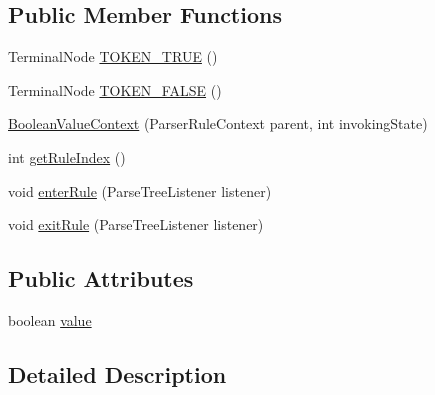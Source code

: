 \subsection*{Public Member Functions}
\begin{DoxyCompactItemize}
\item 
Terminal\+Node \hyperlink{classgov_1_1nasa_1_1jpf_1_1inspector_1_1server_1_1expression_1_1parser_1_1_expression_grammar_parser_1_1_boolean_value_context_a1967c1d88ae5ae1ed71dc1b0293a9e60}{T\+O\+K\+E\+N\+\_\+\+T\+R\+UE} ()
\item 
Terminal\+Node \hyperlink{classgov_1_1nasa_1_1jpf_1_1inspector_1_1server_1_1expression_1_1parser_1_1_expression_grammar_parser_1_1_boolean_value_context_af6b87c58b18cae1ac26f25c9b6704b9f}{T\+O\+K\+E\+N\+\_\+\+F\+A\+L\+SE} ()
\item 
\hyperlink{classgov_1_1nasa_1_1jpf_1_1inspector_1_1server_1_1expression_1_1parser_1_1_expression_grammar_parser_1_1_boolean_value_context_a307b15b7defe4cc95e2d7c9a51c490c0}{Boolean\+Value\+Context} (Parser\+Rule\+Context parent, int invoking\+State)
\item 
int \hyperlink{classgov_1_1nasa_1_1jpf_1_1inspector_1_1server_1_1expression_1_1parser_1_1_expression_grammar_parser_1_1_boolean_value_context_aebe67674b58e3dc76a3bac88d8213bcf}{get\+Rule\+Index} ()
\item 
void \hyperlink{classgov_1_1nasa_1_1jpf_1_1inspector_1_1server_1_1expression_1_1parser_1_1_expression_grammar_parser_1_1_boolean_value_context_a1aa8feac20f24eab9a1e98e8a6209359}{enter\+Rule} (Parse\+Tree\+Listener listener)
\item 
void \hyperlink{classgov_1_1nasa_1_1jpf_1_1inspector_1_1server_1_1expression_1_1parser_1_1_expression_grammar_parser_1_1_boolean_value_context_ae1adfc85ca04e80b992cda3e4dc3aaea}{exit\+Rule} (Parse\+Tree\+Listener listener)
\end{DoxyCompactItemize}
\subsection*{Public Attributes}
\begin{DoxyCompactItemize}
\item 
boolean \hyperlink{classgov_1_1nasa_1_1jpf_1_1inspector_1_1server_1_1expression_1_1parser_1_1_expression_grammar_parser_1_1_boolean_value_context_a184b87c587f1f43ec9288ebade56cf6a}{value}
\end{DoxyCompactItemize}


\subsection{Detailed Description}


